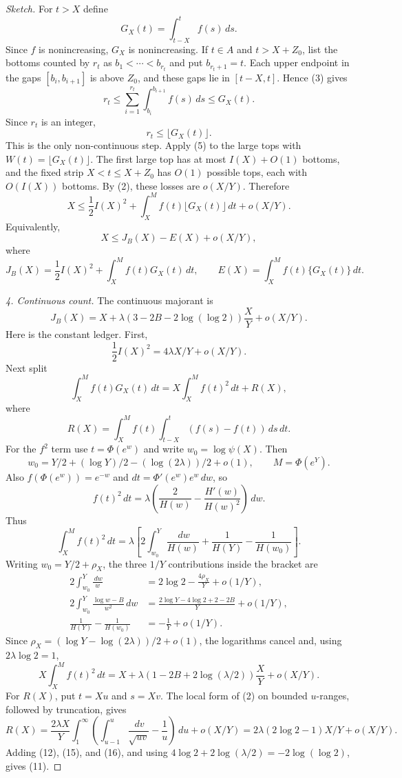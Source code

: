 \documentclass[10pt]{article}
\newcommand{\dd}{\,d}
\newcommand{\floor}[1]{\lfloor #1\rfloor}
\newcommand{\fp}[1]{\{#1\}}
\begin{document}
\begin{proof}[Sketch]
For $t>X$ define
\[
        G_X(t)=\int_{t-X}^t f(s)\dd s .
\]
Since $f$ is nonincreasing, $G_X$ is nonincreasing.  If $t\in A$ and
$t>X+Z_0$, list the bottoms counted by $r_t$ as $b_1<\cdots<b_{r_t}$ and put
$b_{r_t+1}=t$.  Each upper endpoint in the gaps $[b_i,b_{i+1}]$ is above
$Z_0$, and these gaps lie in $[t-X,t]$.  Hence (3) gives
\[
        r_t\le\sum_{i=1}^{r_t}\int_{b_i}^{b_{i+1}} f(s)\dd s
        \le G_X(t).
\]
Since $r_t$ is an integer,
\[
        r_t\le \floor{G_X(t)}.                                \tag{8}
\]
This is the only non-continuous step.  Apply (5) to the large tops with
$W(t)=\floor{G_X(t)}$.  The first large top has at most $I(X)+O(1)$ bottoms,
and the fixed strip $X<t\le X+Z_0$ has $O(1)$ possible tops, each with
$O(I(X))$ bottoms.  By (2), these losses are $o(X/Y)$.  Therefore
\[
        X\le \frac12I(X)^2+
        \int_X^M f(t)\floor{G_X(t)}\dd t+o(X/Y).               \tag{9}
\]
Equivalently,
\[
        X\le J_B(X)-E(X)+o(X/Y),                               \tag{10}
\]
where
\[
        J_B(X)=\frac12I(X)^2+\int_X^M f(t)G_X(t)\dd t,
        \qquad
        E(X)=\int_X^M f(t)\fp{G_X(t)}\dd t .
\]

\smallskip
\noindent\textit{4. Continuous count.}
The continuous majorant is
\[
        J_B(X)=X+
        \lambda(3-2B-2\log(\log2))\frac{X}{Y}+o(X/Y).          \tag{11}
\]
Here is the constant ledger.  First,
\[
        \frac12I(X)^2=4\lambda X/Y+o(X/Y).                     \tag{12}
\]
Next split
\[
        \int_X^M f(t)G_X(t)\dd t
        =X\int_X^M f(t)^2\dd t+R(X),
\]
where
\[
        R(X)=\int_X^M f(t)\int_{t-X}^t(f(s)-f(t))\dd s\dd t .
\]
For the $f^2$ term use $t=\Phi(e^w)$ and write $w_0=\log\psi(X)$.  Then
\[
        w_0=Y/2+(\log Y)/2-(\log(2\lambda))/2+o(1),
        \qquad M=\Phi(e^Y).
\]
Also $f(\Phi(e^w))=e^{-w}$ and $dt=\Phi'(e^w)e^w\,dw$, so
\[
        f(t)^2\dd t
        =\lambda\left(\frac2{H(w)}-\frac{H'(w)}{H(w)^2}\right)\dd w.
\]
Thus
\[
        \int_X^M f(t)^2\dd t
        =\lambda\left[2\int_{w_0}^{Y}\frac{\dd w}{H(w)}
        +\frac1{H(Y)}-\frac1{H(w_0)}\right].                  \tag{13}
\]
Writing $w_0=Y/2+\rho_X$, the three $1/Y$ contributions inside the bracket are
\[
\begin{aligned}
        2\int_{w_0}^{Y}\frac{\dd w}{w}
        &=2\log2-\frac{4\rho_X}{Y}+o(1/Y),\\
        2\int_{w_0}^{Y}\frac{\log w-B}{w^2}\dd w
        &=\frac{2\log Y-4\log2+2-2B}{Y}+o(1/Y),\\
        \frac1{H(Y)}-\frac1{H(w_0)}
        &=-\frac1Y+o(1/Y).
\end{aligned}                                                  \tag{14}
\]
Since $\rho_X=(\log Y-\log(2\lambda))/2+o(1)$, the logarithms cancel and,
using $2\lambda\log2=1$,
\[
        X\int_X^M f(t)^2\dd t
        =X+\lambda(1-2B+2\log(\lambda/2))\frac{X}{Y}+o(X/Y).  \tag{15}
\]
For $R(X)$, put $t=Xu$ and $s=Xv$.  The local form of (2) on bounded
$u$-ranges, followed by truncation, gives
\[
        R(X)=\frac{2\lambda X}{Y}
        \int_1^\infty\left(\int_{u-1}^u\frac{\dd v}{\sqrt{uv}}-
        \frac1u\right)\dd u+o(X/Y)
        =2\lambda(2\log2-1)X/Y+o(X/Y).                       \tag{16}
\]
Adding (12), (15), and (16), and using
$4\log2+2\log(\lambda/2)=-2\log(\log2)$, gives (11).


\end{proof}
\end{document}
